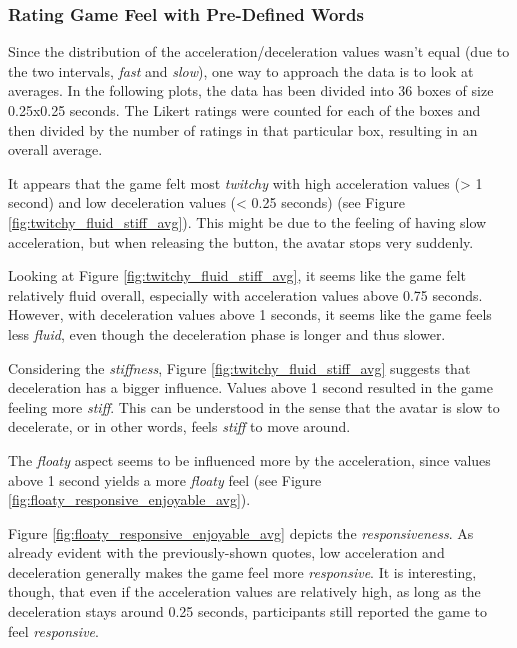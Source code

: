 
\subsubsection{Rating Game Feel with Pre-Defined Words}
Since the distribution of the acceleration/deceleration values wasn't equal (due to the two intervals, \textit{fast} and \textit{slow}), one way to approach the data is to look at averages. In the following plots, the data has been divided into 36 boxes of size 0.25x0.25 seconds. The Likert ratings were counted for each of the boxes and then divided by the number of ratings in that particular box, resulting in an overall average.

It appears that the game felt most \textit{twitchy} with high acceleration values (> 1 second) and low deceleration values (< 0.25 seconds) (see Figure \ref{fig:twitchy_fluid_stiff_avg}). This might be due to the feeling of having slow acceleration, but when releasing the button, the avatar stops very suddenly.

Looking at Figure \ref{fig:twitchy_fluid_stiff_avg}, it seems like the game felt relatively fluid overall, especially with acceleration values above 0.75 seconds. However, with deceleration values above 1 seconds, it seems like the game feels less \textit{fluid}, even though the deceleration phase is longer and thus slower.

Considering the \textit{stiffness}, Figure \ref{fig:twitchy_fluid_stiff_avg} suggests that deceleration has a bigger influence. Values above 1 second resulted in the game feeling more \textit{stiff}. This can be understood in the sense that the avatar is slow to decelerate, or in other words, feels \textit{stiff} to move around.

The \textit{floaty} aspect seems to be influenced more by the acceleration, since values above 1 second yields a more \textit{floaty} feel (see Figure \ref{fig:floaty_responsive_enjoyable_avg}).

Figure \ref{fig:floaty_responsive_enjoyable_avg} depicts the \textit{responsiveness}. As already evident with the previously-shown quotes, low acceleration and deceleration generally makes the game feel more \textit{responsive}. It is interesting, though, that even if the acceleration values are relatively high, as long as the deceleration stays around 0.25 seconds, participants still reported the game to feel \textit{responsive}.

